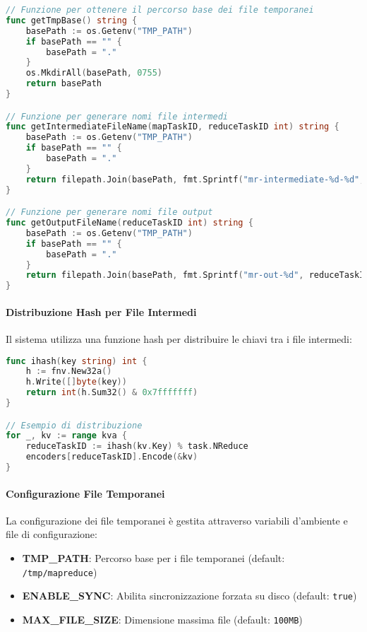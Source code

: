 \documentclass[12pt,a4paper]{article}
\begin{document}
\begin{lstlisting}[language=Go, caption=Funzioni per la gestione dei file temporanei]
// Funzione per ottenere il percorso base dei file temporanei
func getTmpBase() string {
    basePath := os.Getenv("TMP_PATH")
    if basePath == "" {
        basePath = "."
    }
    os.MkdirAll(basePath, 0755)
    return basePath
}

// Funzione per generare nomi file intermedi
func getIntermediateFileName(mapTaskID, reduceTaskID int) string {
    basePath := os.Getenv("TMP_PATH")
    if basePath == "" {
        basePath = "."
    }
    return filepath.Join(basePath, fmt.Sprintf("mr-intermediate-%d-%d", mapTaskID, reduceTaskID))
}

// Funzione per generare nomi file output
func getOutputFileName(reduceTaskID int) string {
    basePath := os.Getenv("TMP_PATH")
    if basePath == "" {
        basePath = "."
    }
    return filepath.Join(basePath, fmt.Sprintf("mr-out-%d", reduceTaskID))
}
\end{lstlisting}

\paragraph{Distribuzione Hash per File Intermedi}

Il sistema utilizza una funzione hash per distribuire le chiavi tra i file intermedi:

\begin{lstlisting}[language=Go, caption=Funzione hash per distribuzione chiavi]
func ihash(key string) int {
    h := fnv.New32a()
    h.Write([]byte(key))
    return int(h.Sum32() & 0x7fffffff)
}

// Esempio di distribuzione
for _, kv := range kva {
    reduceTaskID := ihash(kv.Key) % task.NReduce
    encoders[reduceTaskID].Encode(&kv)
}
\end{lstlisting}

\paragraph{Configurazione File Temporanei}

La configurazione dei file temporanei è gestita attraverso variabili d'ambiente e file di configurazione:

\begin{itemize}
\item \textbf{TMP\_PATH}: Percorso base per i file temporanei (default: \texttt{/tmp/mapreduce})
\item \textbf{ENABLE\_SYNC}: Abilita sincronizzazione forzata su disco (default: \texttt{true})
\item \textbf{MAX\_FILE\_SIZE}: Dimensione massima file (default: \texttt{100MB})
\end{itemize}
\end{document}
